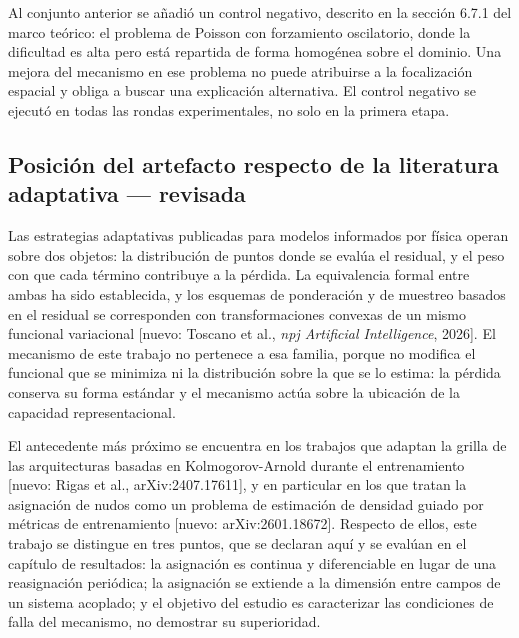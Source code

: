 Al conjunto anterior se añadió un control negativo, descrito en la sección 6.7.1 del marco teórico: el problema de Poisson con forzamiento oscilatorio, donde la dificultad es alta pero está repartida de forma homogénea sobre el dominio. Una mejora del mecanismo en ese problema no puede atribuirse a la focalización espacial y obliga a buscar una explicación alternativa. El control negativo se ejecutó en todas las rondas experimentales, no solo en la primera etapa.

\subsection{Posición del artefacto respecto de la literatura adaptativa — revisada}

Las estrategias adaptativas publicadas para modelos informados por física operan sobre dos objetos: la distribución de puntos donde se evalúa el residual, y el peso con que cada término contribuye a la pérdida. La equivalencia formal entre ambas ha sido establecida, y los esquemas de ponderación y de muestreo basados en el residual se corresponden con transformaciones convexas de un mismo funcional variacional [nuevo: Toscano et al., \textit{npj Artificial Intelligence}, 2026]. El mecanismo de este trabajo no pertenece a esa familia, porque no modifica el funcional que se minimiza ni la distribución sobre la que se lo estima: la pérdida conserva su forma estándar y el mecanismo actúa sobre la ubicación de la capacidad representacional.

El antecedente más próximo se encuentra en los trabajos que adaptan la grilla de las arquitecturas basadas en Kolmogorov-Arnold durante el entrenamiento [nuevo: Rigas et al., arXiv:2407.17611], y en particular en los que tratan la asignación de nudos como un problema de estimación de densidad guiado por métricas de entrenamiento [nuevo: arXiv:2601.18672]. Respecto de ellos, este trabajo se distingue en tres puntos, que se declaran aquí y se evalúan en el capítulo de resultados: la asignación es continua y diferenciable en lugar de una reasignación periódica; la asignación se extiende a la dimensión entre campos de un sistema acoplado; y el objetivo del estudio es caracterizar las condiciones de falla del mecanismo, no demostrar su superioridad.


